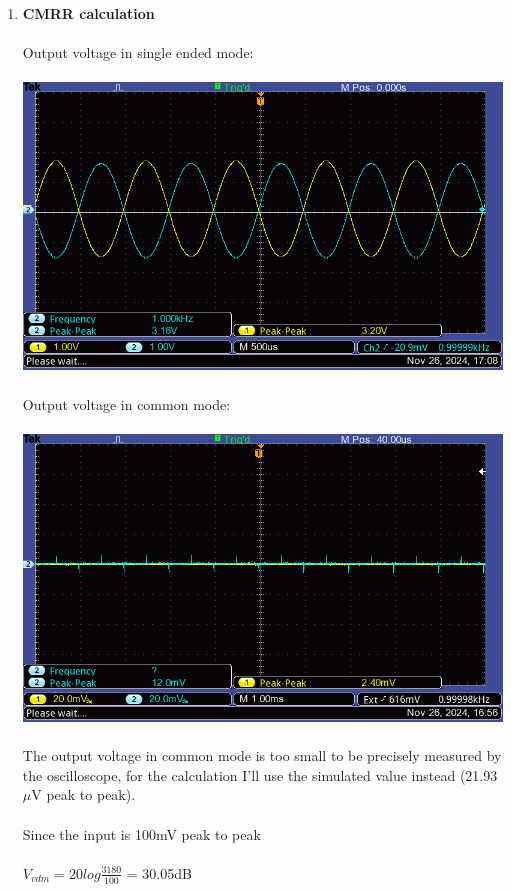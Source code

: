 \documentclass{article}
\begin{document}
\begin{enumerate}
		\pagebreak
		\item \textbf{CMRR calculation}\\\\
		Output voltage in single ended mode:\\\\
		\includegraphics[scale=0.5]{7.3.3.2 Current source diff Collector Vs single/F0003TEK}\\\\
		Output voltage in common mode:\\\\
		\includegraphics[scale=0.5]{7.3.3.3 Current source diff Collector Vs common/F0002TEK}\\\\
		The output voltage in common mode is too small to be precisely measured by the oscilloscope, for the calculation I'll use the simulated value instead (21.93\(\mu\)V peak to peak).\\\\
		Since the input is 100mV peak to peak\\\\ \(V_{vdm} = 20 log\frac{3180}{100}\) = 30.05dB\\\\

\end{enumerate}
\end{document}

